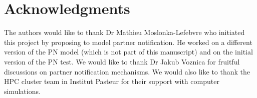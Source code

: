 \documentclass[10pt,letterpaper]{article}
\begin{document}
\section*{Acknowledgments}
The authors would like to thank Dr Mathieu Moslonka-Lefebvre who initiated this project by proposing to model partner notification. He worked on a different version of the PN model (which is not part of this manuscript) and on the initial version of the PN test. We would like to thank Dr Jakub Voznica for fruitful discussions on partner notification mechanisms.
We would also like to thank the HPC cluster team in Institut Pasteur for their support with computer simulations.

\nolinenumbers



%
%
% 
%
%
%
%
\end{document}
